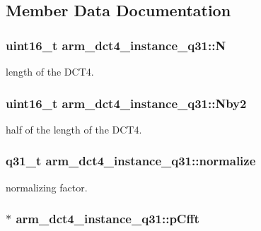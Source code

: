 \subsection{Member Data Documentation}
\hypertarget{structarm__dct4__instance__q31_a46a9f136457350676e2bfd3768ff9d6d}{
\subsubsection[{N}]{\setlength{\rightskip}{0pt plus 5cm}uint16\-\_\-t arm\-\_\-dct4\-\_\-instance\-\_\-q31\-::\-N}}\label{structarm__dct4__instance__q31_a46a9f136457350676e2bfd3768ff9d6d}
length of the D\-C\-T4. \hypertarget{structarm__dct4__instance__q31_a32d3268ba4629908dba056599f0a904d}{
\subsubsection[{Nby2}]{\setlength{\rightskip}{0pt plus 5cm}uint16\-\_\-t arm\-\_\-dct4\-\_\-instance\-\_\-q31\-::\-Nby2}}\label{structarm__dct4__instance__q31_a32d3268ba4629908dba056599f0a904d}
half of the length of the D\-C\-T4. \hypertarget{structarm__dct4__instance__q31_ac80ff7b28fca36aeef74dea12e8312dd}{
\subsubsection[{normalize}]{\setlength{\rightskip}{0pt plus 5cm}q31\-\_\-t arm\-\_\-dct4\-\_\-instance\-\_\-q31\-::normalize}}\label{structarm__dct4__instance__q31_ac80ff7b28fca36aeef74dea12e8312dd}
normalizing factor. \hypertarget{structarm__dct4__instance__q31_ac96579cfb28d08bb11dd2fe4c6303833}{
\subsubsection[{p\-Cfft}]{$\ast$ arm\-\_\-dct4\-\_\-instance\-\_\-q31\-::p\-Cfft}}\label{structarm__dct4__instance__q31_ac96579cfb28d08bb11dd2fe4c6303833}
